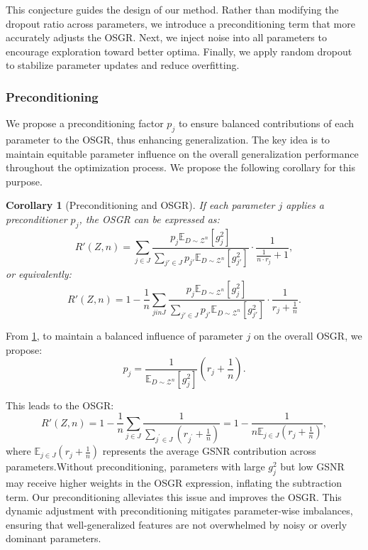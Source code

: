 \documentclass{article}
\theoremstyle{plain}
\newtheorem{corollary}[theorem]{Corollary}
\theoremstyle{definition}
\theoremstyle{remark}
\begin{document}
This conjecture guides the design of our method. Rather than modifying the dropout ratio across parameters, we introduce a preconditioning term that more accurately adjusts the OSGR. Next, we inject noise into all parameters to encourage exploration toward better optima. Finally, we apply random dropout to stabilize parameter updates and reduce overfitting.

\subsubsection{Preconditioning}
\label{method:Preconditioning}
We propose a preconditioning factor $p_j$  to ensure balanced contributions of each parameter to the OSGR, thus enhancing generalization. The key idea is to maintain equitable parameter influence on the overall generalization performance throughout the optimization process. We propose the following corollary for this purpose. 
\begin{corollary}[Preconditioning and OSGR]\label{cor:osgr}
If each parameter $j$ applies a preconditioner $p_j$, the OSGR can be expressed as:
\begin{equation}
R'(Z,n) = \sum_{j\in J}\frac{ p_j \mathbb{E}_{D\sim\mathcal{Z}^n}[g_j^2]}{\sum_{j'\in J} p_{j'} \mathbb{E}_{D\sim\mathcal{Z}^n}[g_{j'}^2]} \cdot \frac{1}{\frac{1}{n \cdot r_j} + 1},
\end{equation}
or equivalently:
\begin{equation}
R'(Z,n) = 1 - \frac{1}{n}\sum_{jinJ} \frac{p_j \mathbb{E}_{D\sim\mathcal{Z}^n}[g_j^2]}{\sum_{j' \in J} p_{j'} \mathbb{E}_{D\sim\mathcal{Z}^n}[g_{j'}^2]} \cdot \frac{1}{ r_j + \frac{1}{n}}.
\end{equation}
\end{corollary}

From \cref{cor:osgr}, to maintain a balanced influence of parameter $j$ on the overall OSGR, we propose:
\begin{equation}
p_j = \frac{1}{\mathbb{E}_{D\sim\mathcal{Z}^n}\left[g_j^2\right]} \left( r_j + \frac{1}{n} \right).
\end{equation}

This leads to the OSGR:
\begin{equation}
R'(Z,n)= 1 - \frac{1}{n}\sum_{j \in J} \frac{1}{\sum_{j^\prime \in J} \left(r_{j^\prime}+\frac{1}{n}\right)} = 1 - \frac{1}{n\mathbb{E}_{j \in J} \left(r_{j}+\frac{1}{n}\right)},
\end{equation}
where $\mathbb{E}_{j \in J}\left(r_{j}+\frac{1}{n}\right)$ represents the average GSNR contribution across parameters.Without preconditioning, parameters with large $g_j^2$  but low GSNR may receive higher weights in the OSGR expression, inflating the subtraction term. Our preconditioning alleviates this issue and improves the OSGR. 
This dynamic adjustment with preconditioning mitigates parameter-wise imbalances, ensuring that well-generalized features are not overwhelmed by noisy or overly dominant parameters.
\end{document}
